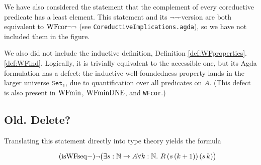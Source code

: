 \begin{enumerate}

\end{enumerate}

We have also considered the statement that the complement of every coreductive predicate
  has a least element.  This statement and its $\lnot\lnot$-version are both equivalent to $\mathrm{WFcor}{\lnot\lnot}$
  (see \texttt{CoreductiveImplications.agda}), so we have not included them in the figure.

We also did not include the inductive definition, Definition \ref{def:WFproperties}.\ref{def:WFind}.
  Logically, it is trivially equivalent to the accessible one, but its Agda formulation has a defect:
  the inductive well-foundedness property lands in the larger universe $\mathtt{Set}_1$, due to
  quantification over all predicates on $A$.  (This defect is also present in $\mathrm{WFmin}$, $\mathrm{WFminDNE}$, and \texttt{WFcor}.)


\subsection{Old. Delete?}

Translating this statement directly into type theory yields the formula

\[\tag{$\isWFseqm$} \lnot \big(\exists s : \nat \to A \forall k : \nat. \  R \,(s\,(k+1)) \, (s\, k) \big) \]

